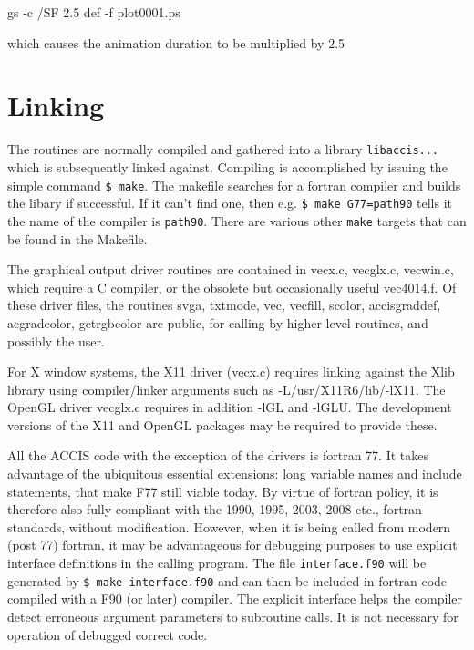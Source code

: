 \documentclass[12pt]{article}
\begin{document}
gs -c /SF 2.5 def -f plot0001.ps

which causes the animation duration to be multiplied by 2.5

\section{Linking}

The routines are normally compiled and gathered into a library
\verb!libaccis...! which is subsequently linked against. Compiling is
accomplished by issuing the simple command \verb!$ make!. The makefile
searches for a fortran compiler and builds the libary if
successful. If it can't find one, then e.g. \verb!$ make G77=path90!
tells it the name of the compiler is \verb!path90!. There are various
other \verb!make! targets that can be found in the Makefile.

The graphical output driver routines are contained in vecx.c,
vecglx.c, vecwin.c, which require a C compiler, or the obsolete but
occasionally useful vec4014.f. Of these driver files, the routines
svga, txtmode, vec, vecfill, scolor, accisgraddef, acgradcolor,
getrgbcolor are public, for calling by higher level routines, and
possibly the user.

For X window systems, the X11 driver (vecx.c) requires linking against
the Xlib library using compiler/linker arguments such as
-L/usr/X11R6/lib/-lX11.  The OpenGL driver vecglx.c requires in
addition -lGL and -lGLU. The development versions of the X11 and
OpenGL packages may be required to provide these.

All the ACCIS code with the exception of the drivers is fortran 77.
It takes advantage of the ubiquitous essential extensions: long
variable names and include statements, that make F77 still viable
today.  By virtue of fortran policy, it is therefore also fully
compliant with the 1990, 1995, 2003, 2008 etc., fortran standards,
without modification. However, when it is being called from modern
(post 77) fortran, it may be advantageous for debugging purposes to
use explicit interface definitions in the calling program. The file
\verb!interface.f90! will be generated by \verb!$ make interface.f90!
and can then be included in fortran code compiled with a F90 (or
later) compiler. The explicit interface helps the compiler detect
erroneous argument parameters to subroutine calls. It is not necessary
for operation of debugged correct code.
\end{document}
